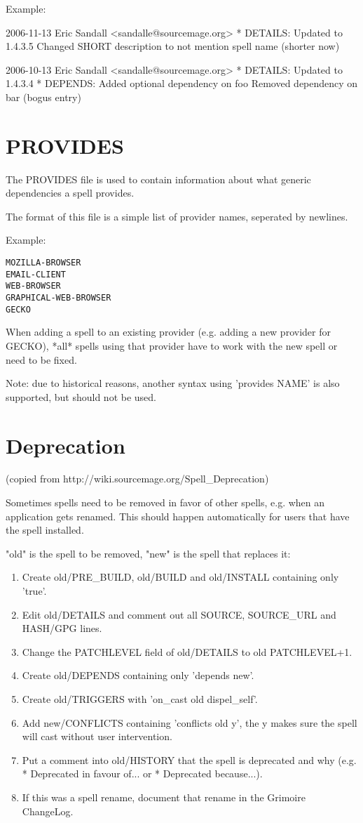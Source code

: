 \documentclass[a4paper,10pt]{book}
\begin{document}
Example:
\begin{verbatim*}
2006-11-13 Eric Sandall <sandalle@sourcemage.org>
	* DETAILS: Updated to 1.4.3.5
	  Changed SHORT description to not mention spell name (shorter now)

2006-10-13 Eric Sandall <sandalle@sourcemage.org>
	* DETAILS: Updated to 1.4.3.4
	* DEPENDS: Added optional dependency on foo
	  Removed dependency on bar (bogus entry)
\end{verbatim*}

\section{PROVIDES}
The PROVIDES file is used to contain information about what generic
dependencies a spell provides.

The format of this file is a simple list of provider names, seperated by
newlines.

Example:
\begin{verbatim}
MOZILLA-BROWSER
EMAIL-CLIENT
WEB-BROWSER
GRAPHICAL-WEB-BROWSER
GECKO
\end{verbatim}

When adding a spell to an existing provider (e.g. adding a new provider for
GECKO), *all* spells using that provider have to work with the new spell or
need
to be fixed.

Note: due to historical reasons, another syntax using 'provides \textdollar
NAME' is also
supported, but should not be used.

\section{Deprecation}
(copied from http://wiki.sourcemage.org/Spell\_Deprecation)

Sometimes spells need to be removed in favor of other spells, e.g. when an
application gets renamed. This should happen automatically for users that
have the spell installed.

"old" is the spell to be removed, "new" is the spell that replaces it:
\begin{enumerate}
\item Create old/PRE\_BUILD, old/BUILD and old/INSTALL containing only
	'true'.
\item Edit old/DETAILS and comment out all SOURCE, SOURCE\_URL and HASH/GPG
	lines.
\item Change the PATCHLEVEL field of old/DETAILS to old PATCHLEVEL+1.
\item Create old/DEPENDS containing only 'depends new'.
\item Create old/TRIGGERS with 'on\_cast old dispel\_self'.
\item Add new/CONFLICTS containing 'conflicts old y', the y makes sure the
	spell will cast without user intervention.
\item Put a comment into old/HISTORY that the spell is deprecated and why
	(e.g. * Deprecated in favour of... or * Deprecated because...).
\item If this was a spell rename, document that rename in the Grimoire
	ChangeLog.
\end{enumerate}
\end{document}

